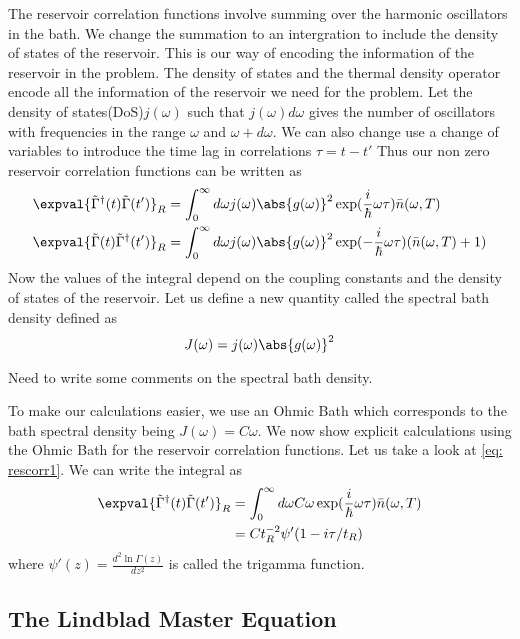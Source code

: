 \documentclass{scrartcl}
\newcommand{\1}{\mathbbm{1}}
\newcommand{\G}{\Gamma}
\newcommand{\iG}{\tilde{\Gamma}}
\newcommand{\nbar}{\bar{n}}
\begin{document}
The reservoir correlation functions involve summing over the harmonic oscillators in the bath. We change the summation
to an intergration to include the density of states of the reservoir. This is our way of encoding the
information of the reservoir in the problem. The density of states and the thermal density operator encode
all the information of the reservoir we need for the problem. Let the density of states(DoS)\(j(\omega)\) such that
\(j(\omega) d\omega\) gives the number of oscillators with frequencies in the range \(\omega\) and \(\omega + d\omega\). We can also
change use a change of variables to introduce the time lag in correlations \(\tau = t-t'\)
Thus our non zero reservoir correlation functions can be written as
\begin{align}
	\expval{\iG^\dagger(t)\iG(t')}_R & = \int_0^\infty d\omega j(\omega) \abs{g(\omega)}^2 \exp(\frac{i}{\hbar} \omega \tau) \nbar(\omega,T) \label{eq: rescorr1}\\
	\expval{\iG(t)\iG^\dagger(t')}_R & = \int_0^\infty d\omega j(\omega) \abs{g(\omega)}^2 \exp(-\frac{i}{\hbar} \omega \tau) (\nbar(\omega,T)+1)
\end{align}
Now the values of the integral depend on the coupling constants and the density of states of the reservoir. Let us define a new quantity called the spectral bath density
defined as 
\begin{equation}
	J(\omega) = j(\omega) \abs{g(\omega)}^2	
\end{equation}

\begin{remark}
	Need to write some comments on the spectral bath density.
\end{remark}
To make our calculations easier, we use an Ohmic Bath which corresponds to the bath spectral density being 
\(J(\omega) = C \omega\). We now show explicit calculations using the Ohmic Bath for the reservoir correlation functions.
Let us take a look at \cref{eq: rescorr1}. We can write the integral as
\begin{align}
	\expval{\iG^\dagger(t)\iG(t')}_R & = \int_0^\infty d\omega C \omega \exp(\frac{i}{\hbar} \omega \tau) \nbar(\omega,T) \\
	& = C t_R^{-2} \psi'(1-i \tau / t_R)
\end{align}
where \(\psi'(z) = \frac{d^2 \ln \G (z)}{dz^2}\) is called the trigamma function.

\subsection{The Lindblad Master Equation}
\end{document}
